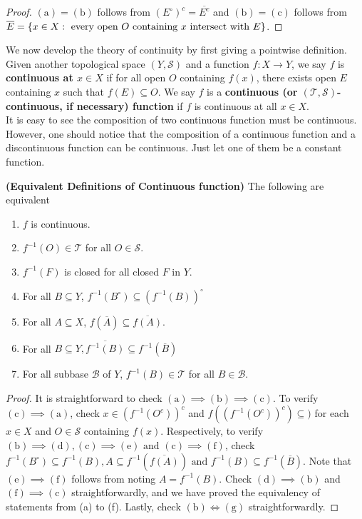 \documentclass{report}
\begin{document}
\begin{proof}
$(\text{a})=(\text{b})$ follows from $(E^\circ )^c = \overline{E^c}$ and $(\text{b})=(\text{c})$ follows from $\overline{E}=\{ x\in X:\text{ every open $O$ containing  $x$ intersect with $E$} \}$. 
\end{proof}
\begin{mdframed}
We now develop the theory of continuity by first giving a pointwise definition. Given another topological space $(Y,\mathscr{S})$ and a function $f:X\rightarrow Y$, we say $f$ is \textbf{continuous at $x\in X$} if for all open $O$ containing $f(x)$, there exists open $E$ containing $x$ such that $f(E)\subseteq O$. We say $f$ is a \textbf{continuous (or $(\mathscr{T },\mathscr{S })$-continuous, if necessary) function} if $f$ is continuous at all $x\in X$. \\

It is easy to see the composition of two continuous function must be continuous. However, one should notice that the composition of a continuous function and a discontinuous function can be continuous. Just let one of them be a constant function.
\end{mdframed}
\begin{theorem}
\textbf{(Equivalent Definitions of Continuous function)} The following are equivalent 
\begin{enumerate}[label=(\alph*)]
  \item $f$ is continuous.
  \item  $f^{-1}(O)\in \mathscr{T }$ for all $O\in \mathscr{S }$.
  \item $f^{-1}(F)$ is closed for all closed $F$ in $Y$. 
  \item For all $B\subseteq Y$, $f^{-1}(B^\circ )\subseteq (f^{-1}(B))^{\circ }$
  \item For all $A\subseteq X$, $f(\overline{A})\subseteq \overline{f(A)}$. 
  \item For all $B\subseteq Y,\overline{f^{-1}(B)}\subseteq f^{-1}(\overline{B})$
  \item For all subbase $\mathcal{B}$ of $Y$, $f^{-1}(B)\in \mathscr{T }$ for all $B \in \mathcal{B}$.
\end{enumerate}
\end{theorem}
\begin{proof}
It is straightforward to check  $(\text{a})\implies (\text{b})\implies (\text{c})$. To verify $(\text{c})\implies (\text{a})$, check $x\in (f^{-1}(O^c))^c$ and $f((f^{-1}(O^c))^c)\subseteq )$ for each $x \in X$ and $O \in \mathscr{S}$ containing $f(x)$. Respectively, to verify $(\text{b})\implies (\text{d}),(\text{c})\implies (\text{e})\text{ and }(\text{c})\implies (\text{f})$, check  $f^{-1}(B^\circ )\subseteq f^{-1}(B),A\subseteq f^{-1}(\overline{f(A)})\text{ and }f^{-1}(B)\subseteq f^{-1}(\overline{B})$. Note that $(\text{e})\implies (\text{f})$ follows from noting $A=f^{-1}(B)$. Check $(\text{d})\implies (\text{b})$ and $(\text{f})\implies (\text{c})$ straightforwardly, and we have proved the equivalency of statements from (a) to (f). Lastly, check $(\text{b})\iff (\text{g})$ straightforwardly.  
\end{proof}
\end{document}
